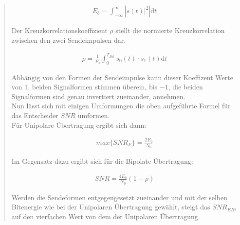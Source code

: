 \begin{quote}
    \begin{equation*}
    	\begin{split}
    		E_b = \int_{-\infty}^{\infty} \left | s(t)|^2 \right | \mathrm dt
    	\end{split}
        
    \end{equation*}
    
    
    Der Kreuzkorrelationskoeffizient $\rho$ stellt die normierte Kreuzkorrelation zwischen den zwei Sendeimpulsen dar.\cite{kreuz}
    
    \begin{equation*}
    	\begin{split}
    		\rho = \frac{1}{E_b} \int_{0}^{T_{Bit}} s_0(t) \cdot s_1(t) \mathrm dt
    	\end{split}
    \end{equation*}
    
    Abhängig von den Formen der Sendeimpulse kann dieser Koeffizent Werte von $1$, beiden Signalformen stimmen überein,
    bis $-1$, die beiden Signalformen sind genau invertiert zueinander, annehmen.\\
        
    Nun lässt sich mit einigen Umformungen die oben aufgeführte Formel für das Entscheider $SNR$ umformen.\\
    Für Unipolare Übertragung ergibt sich dann:
    
    \begin{equation*}
    	\begin{split}
    		max\{SNR_E\} = \frac{2 E_b}{N_0}
    	\end{split}
    \end{equation*}
    
    Im Gegensatz dazu ergibt sich für die Bipolate Übertragung:
    
    \begin{equation*}
    	\begin{split}
    		SNR = \frac{4 E_b}{N_0} (1-\rho)
    	\end{split}
    \end{equation*}
    
    Werden die Sendeformen entgegengesetzt zueinander und mit der selben Bitenergie wie bei der Unipolaren
    Übertragung gewählt, steigt das $SNR_{E Bi}$ auf den vierfachen Wert von dem
    der Unipolaren Übertragung.\\
    
    
	
\end{quote}%


